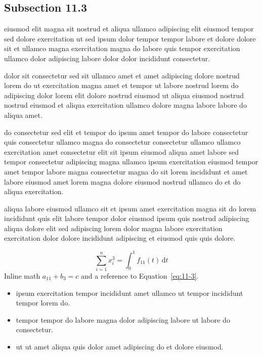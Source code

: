 \documentclass{article}
\begin{document}
\subsection{Subsection 11.3}\label{sec:11-3}
eiusmod elit magna sit nostrud et aliqua ullamco adipiscing elit eiusmod tempor sed dolore exercitation ut sed ipsum dolor tempor tempor labore et dolore dolore sit et ullamco magna exercitation magna do labore quis tempor exercitation ullamco dolor adipiscing labore dolor dolor incididunt consectetur.

dolor sit consectetur sed sit ullamco amet et amet adipiscing dolore nostrud lorem do ut exercitation magna amet et tempor ut labore nostrud lorem do adipiscing dolor lorem elit dolore nostrud eiusmod ut aliqua eiusmod nostrud nostrud eiusmod et aliqua exercitation ullamco dolore magna labore labore do aliqua amet.

do consectetur sed elit et tempor do ipsum amet tempor do labore consectetur quis consectetur ullamco magna do consectetur consectetur ullamco ullamco exercitation amet consectetur elit sit ipsum eiusmod aliqua amet labore sed tempor consectetur adipiscing magna ullamco ipsum exercitation eiusmod tempor amet tempor labore magna consectetur magna do sit lorem incididunt et amet labore eiusmod amet lorem magna dolore eiusmod nostrud ullamco do et do aliqua exercitation.

aliqua labore eiusmod ullamco sit et ipsum amet exercitation magna sit do lorem incididunt quis elit labore tempor dolor eiusmod ipsum quis nostrud adipiscing aliqua dolore elit sed adipiscing lorem dolor magna labore exercitation exercitation dolor dolore incididunt adipiscing et eiusmod quis quis dolore.

\begin{equation}\label{eq:11-3}
  \sum_{i=1}^{n} x_i^{3} = \int_0^1 f_{11}(t)\,\mathrm{d}t
\end{equation}
Inline math $a_{11} + b_{3} = c$ and a reference to Equation~\eqref{eq:11-3}.

\begin{itemize}
  \item ipsum exercitation tempor incididunt amet ullamco ut tempor incididunt tempor lorem do.
  \item tempor tempor do labore magna dolor adipiscing labore ut labore do consectetur.
  \item ut ut amet aliqua quis dolor amet adipiscing do et dolore eiusmod.
\end{itemize}
\end{document}
